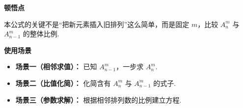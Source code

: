 \begin{explanationbox}
\medskip
\textbf{\textcolor{CExplanation}{顿悟点}}\par
本公式的关键不是“把新元素插入旧排列”这么简单，而是固定 $m$，比较 $A_n^m$ 与 $A_{n-1}^m$ 的整体比例.

\medskip
\textbf{\textcolor{CExplanation}{使用场景}}
\begin{itemize}[leftmargin=*, itemsep=0.5em, topsep=0.4em]
  \item \textbf{场景一（相邻求值）：} 已知 $A_{n-1}^m$，一步求 $A_n^m$.
  \item \textbf{场景二（比值化简）：} 化简含有 $A_n^m$ 与 $A_{n-1}^m$ 的式子.
  \item \textbf{场景三（参数求解）：} 根据相邻排列数的比例建立方程.
\end{itemize}
\end{explanationbox}
